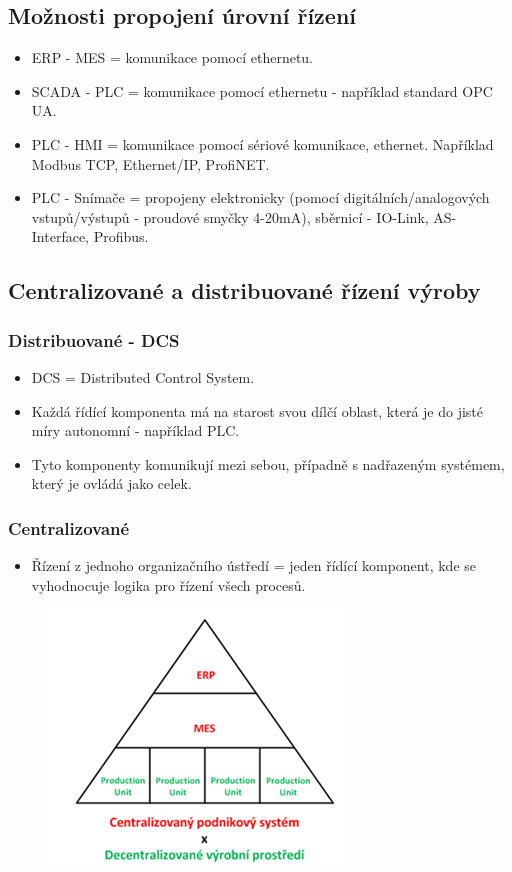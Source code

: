 \subsection{Možnosti propojení úrovní řízení}
\begin{itemize}
    \item ERP - MES = komunikace pomocí ethernetu.
    \item SCADA - PLC = komunikace pomocí ethernetu - například standard OPC UA.
    \item PLC - HMI = komunikace pomocí sériové komunikace, ethernet. Například Modbus TCP, Ethernet/IP, ProfiNET.
    \item PLC - Snímače = propojeny elektronicky (pomocí digitálních/analogových vstupů/výstupů - proudové smyčky 4-20mA), sběrnicí - IO-Link, AS-Interface, Profibus.
\end{itemize}

\subsection{Centralizované a distribuované řízení výroby}
\subsubsection*{Distribuované - DCS}
\begin{itemize}
    \item DCS = Distributed Control System.
    \item Každá řídící komponenta má na starost svou dílčí oblast, která je do jisté míry autonomní - například PLC.
    \item Tyto komponenty komunikují mezi sebou, případně s nadřazeným systémem, který je ovládá jako celek.
\end{itemize}

\subsubsection*{Centralizované}
\begin{itemize}
    \item Řízení z jednoho organizačního ústředí = jeden řídící komponent, kde se vyhodnocuje logika pro řízení všech procesů.
\end{itemize}

\begin{figure}[h]
    \begin{center}
      \includegraphics[scale = 1]{img/picture2.png}
    \end{center}
  \end{figure}

